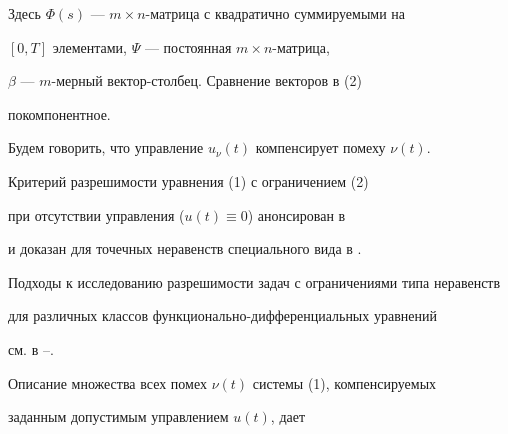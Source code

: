 Здесь $\Phi(s)$ --- $m\times n$-матрица с квадратично суммируемыми на


$[0,T]$ элементами, $\Psi$ --- постоянная $m\times n$-матрица,


$\beta$ --- $m$-мерный вектор-столбец. Сравнение векторов в (2)


покомпонентное.





Будем говорить, что управление $u_\nu(t)$ компенсирует помеху $\nu(t)$.





Критерий разрешимости уравнения (1) с ограничением (2)


при отсутствии управления ($u(t)\equiv 0$) анонсирован в \cite{1}


и доказан для точечных неравенств специального вида в \cite{2}.


Подходы к исследованию разрешимости задач с ограничениями типа неравенств


для различных классов функционально-дифференциальных уравнений


см. в \cite{3}--\cite{6}.





Описание множества всех помех $\nu(t)$ системы (1), компенсируемых


заданным допустимым управлением $u(t)$, дает





